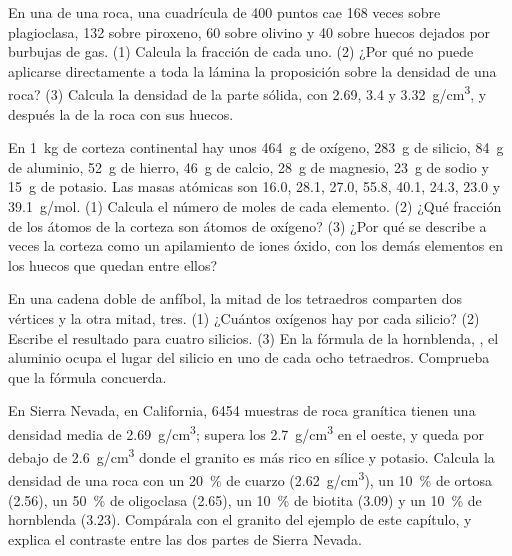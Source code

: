 \begin{exercise}[$\star\star$]\label{exo:g11:minerals:11}
En una  de una roca, una cuadrícula de 400 puntos cae 168 veces
sobre plagioclasa, 132 sobre piroxeno, 60 sobre olivino y 40 sobre huecos
dejados por burbujas de gas. (1) Calcula la fracción de cada uno. (2) ¿Por qué
no puede aplicarse directamente a toda la lámina la proposición sobre la
densidad de una roca? (3) Calcula la densidad de la parte sólida, con \qty{2.69}{},
\qty{3.4}{} y \qty{3.32}{g/cm^3}, y después la de la roca con sus huecos.
\end{exercise}

\begin{exercise}[$\star\star\star$]\label{exo:g11:minerals:12}
En \qty{1}{kg} de corteza continental hay unos \qty{464}{g} de oxígeno,
\qty{283}{g} de silicio, \qty{84}{g} de aluminio, \qty{52}{g} de hierro,
\qty{46}{g} de calcio, \qty{28}{g} de magnesio, \qty{23}{g} de sodio y
\qty{15}{g} de potasio. Las masas atómicas son \qty{16.0}{}, \qty{28.1}{},
\qty{27.0}{}, \qty{55.8}{}, \qty{40.1}{}, \qty{24.3}{}, \qty{23.0}{} y
\qty{39.1}{g/mol}. (1) Calcula el número de moles de cada elemento. (2) ¿Qué
fracción de los átomos de la corteza son átomos de oxígeno? (3) ¿Por qué se
describe a veces la corteza como un apilamiento de iones óxido, con los demás
elementos en los huecos que quedan entre ellos?
\end{exercise}

\begin{exercise}[$\star\star\star$]\label{exo:g11:minerals:13}
En una cadena doble de anfíbol, la mitad de los tetraedros comparten dos
vértices y la otra mitad, tres. (1) ¿Cuántos oxígenos hay por cada silicio?
(2) Escribe el resultado para cuatro silicios. (3) En la fórmula de la
hornblenda, , el aluminio ocupa el lugar del
silicio en uno de cada ocho tetraedros. Comprueba que la fórmula concuerda.
\end{exercise}

\begin{exercise}[$\star\star\star$]\label{exo:g11:minerals:14}
En Sierra Nevada, en California, \num{6454} muestras de roca granítica tienen
una densidad media de \qty{2.69}{g/cm^3}; supera los \qty{2.7}{g/cm^3} en el
oeste, y queda por debajo de \qty{2.6}{g/cm^3} donde el granito es más rico en
sílice y potasio. Calcula la densidad de una roca con un \qty{20}{\percent} de
cuarzo (\qty{2.62}{g/cm^3}), un \qty{10}{\percent} de ortosa (\qty{2.56}{}),
un \qty{50}{\percent} de oligoclasa (\qty{2.65}{}), un \qty{10}{\percent} de
biotita (\qty{3.09}{}) y un \qty{10}{\percent} de hornblenda (\qty{3.23}{}).
Compárala con el granito del ejemplo de este capítulo, y explica el contraste
entre las dos partes de Sierra Nevada.
\end{exercise}

